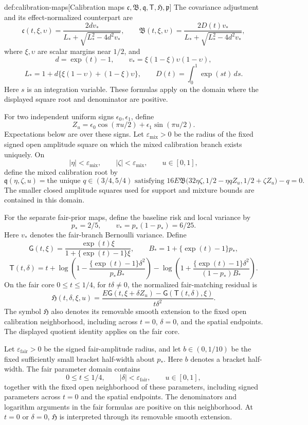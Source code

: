 \begin{definitionv}{def:calibration-maps}[Calibration maps $\mathfrak c,\mathfrak B,\mathfrak q,\mathsf T,\mathfrak H,\mathfrak p$]
The covariance adjustment and its effect-normalized counterpart are
\[
\mathfrak c(t,\xi,\upsilon)
=\frac{2dv_*}{L_*+\sqrt{L_*^2-4d^2v_*}},\qquad
\mathfrak B(t,\xi,\upsilon)
=\frac{2D(t)v_*}{L_*+\sqrt{L_*^2-4d^2v_*}},
\]
where \(\xi,\upsilon\) are scalar margins near \(1/2\), and
\[
d=\exp(t)-1,\qquad
v_*=\xi(1-\xi)\upsilon(1-\upsilon),
\]
\[
L_*=1+d\{\xi(1-\upsilon)+(1-\xi)\upsilon\},\qquad
D(t)=\int_0^1\exp(st)\,ds.
\]
Here \(s\) is an integration variable. These formulas apply on the domain where the displayed square root and denominator are positive.

For two independent uniform signs \(\epsilon_0,\epsilon_1\), define
\[
Z_u=\epsilon_0\cos(\pi u/2)+\epsilon_1\sin(\pi u/2).
\]
Expectations below are over these signs. Let \(\varepsilon_{\mathrm{mix}}>0\) be the radius of the fixed signed open amplitude square on which the mixed calibration branch exists uniquely. On
\[
|\eta|<\varepsilon_{\mathrm{mix}},\qquad
|\zeta|<\varepsilon_{\mathrm{mix}},\qquad
u\in[0,1],
\]
define the mixed calibration root by
\[
\mathfrak q(\eta,\zeta,u)
=
\text{the unique }q\in(3/4,5/4)
\text{ satisfying }
16E\mathfrak B
\bigl(32\eta\zeta,1/2-\eta qZ_u,1/2+\zeta Z_u\bigr)-q=0.
\]
The smaller closed amplitude squares used for support and mixture bounds are contained in this domain.

For the separate fair-prior maps, define the baseline risk and local variance by
\[
p_*=2/5,\qquad v_*=p_*(1-p_*)=6/25.
\]
Here \(v_*\) denotes the fair-branch Bernoulli variance. Define
\[
\mathsf G(t,\xi)
=\frac{\exp(t)\xi}{1+\{\exp(t)-1\}\xi},\qquad
B_*=1+\{\exp(t)-1\}p_*,
\]
\[
\mathsf T(t,\delta)
=t+
\log\left(1-\frac{\{\exp(t)-1\}\delta^2}{p_*B_*}\right)
-\log\left(1+\frac{\{\exp(t)-1\}\delta^2}{(1-p_*)B_*}\right).
\]
On the fair core \(0\le t\le1/4\), for \(t\delta\ne0\), the normalized fair-matching residual is
\[
\mathfrak H(t,\delta,\xi,u)
=
\frac{
E\mathsf G(t,\xi+\delta Z_u)
-\mathsf G(\mathsf T(t,\delta),\xi)
}{t\delta^2}.
\]
The symbol \(\mathfrak H\) also denotes its removable smooth extension to the fixed open calibration neighborhood, including across \(t=0\), \(\delta=0\), and the spatial endpoints. The displayed quotient identity applies on the fair core.

Let \(\varepsilon_{\mathrm{fair}}>0\) be the signed fair-amplitude radius, and let \(b\in(0,1/10)\) be the fixed sufficiently small bracket half-width about \(p_*\). Here \(b\) denotes a bracket half-width. The fair parameter domain contains
\[
0\le t\le1/4,\qquad
|\delta|<\varepsilon_{\mathrm{fair}},\qquad
u\in[0,1],
\]
together with the fixed open neighborhood of these parameters, including signed parameters across \(t=0\) and the spatial endpoints. The denominators and logarithm arguments in the fair formulas are positive on this neighborhood. At \(t=0\) or \(\delta=0\), \(\mathfrak H\) is interpreted through its removable smooth extension.


\end{definitionv}
